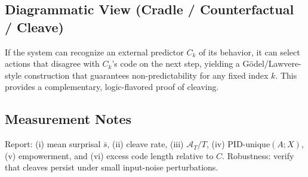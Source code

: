 \subsection{Diagrammatic View (Cradle / Counterfactual / Cleave)}
\begin{center}
\end{center}

\begin{remark}
If the system can recognize an external predictor \(C_k\) of its behavior, it can select actions that disagree with \(C_k\)'s code on the next step, yielding a Gödel/Lawvere-style construction that guarantees non-predictability for any fixed index \(k\). This provides a complementary, logic-flavored proof of cleaving.
\end{remark}

\subsection{Measurement Notes}
Report: (i) mean surprisal $\bar{s}$, (ii) cleave rate, (iii) $\mathcal{A}_T/T$, (iv) PID-unique$(A;X)$, (v) empowerment, and (vi) excess code length relative to $C$. Robustness: verify that cleaves persist under small input-noise perturbations.
